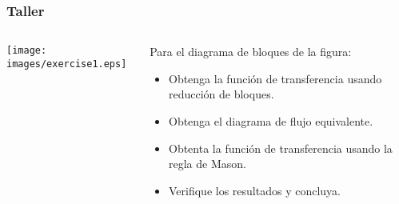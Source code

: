\documentclass[aspectratio=169,handout]{beamer}
\theoremstyle{definition}
\theoremstyle{plain}
\theoremstyle{remark}
\begin{document}
\begin{frame}[<+->]\frametitle{Taller}
\begin{columns}
\begin{column}{0.5\textwidth}
\centering
\vspace*{5mm} \texttt{[image: images/exercise1.eps]}
\end{column}
\begin{column}{0.5\textwidth}
Para el diagrama de bloques de la figura:\\
\begin{itemize}
	\item Obtenga la función de transferencia usando reducción de bloques.
	\item Obtenga el diagrama de flujo equivalente.
	\item Obtenta la función de transferencia usando la regla de Mason.
	\item Verifique los resultados y concluya.
\end{itemize}
\end{column}
\end{columns}
\end{frame}


\end{document}
